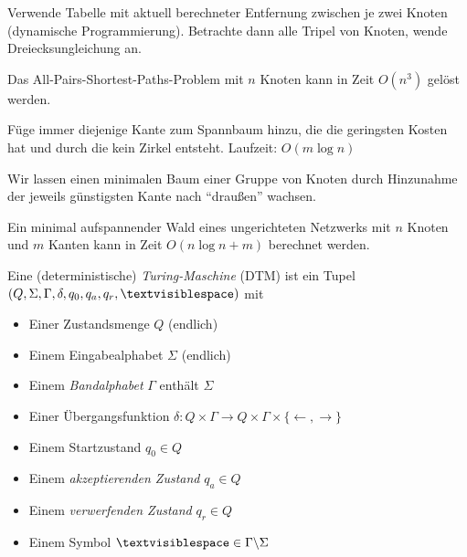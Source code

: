 \documentclass{cheat-sheet}
\begin{document}

\begin{alg}
  Verwende Tabelle mit aktuell berechneter Entfernung zwischen je zwei Knoten (dynamische Programmierung). Betrachte dann alle Tripel von Knoten, wende Dreiecksungleichung an.
\end{alg}

\begin{satz}
  Das All-Pairs-Shortest-Paths-Problem mit $n$ Knoten kann in Zeit $O(n^3)$ gelöst werden.
\end{satz}




\begin{alg}[Kruskal]
  Füge immer diejenige Kante zum Spannbaum hinzu, die die geringsten Kosten hat und durch die kein Zirkel entsteht. Laufzeit: $O(m \log n)$
\end{alg}


\begin{alg}[Prim]
  Wir lassen einen minimalen Baum einer Gruppe von Knoten durch Hinzunahme der jeweils günstigsten Kante nach "`draußen"' wachsen.
\end{alg}

\begin{satz}
  Ein minimal aufspannender Wald eines ungerichteten Netzwerks mit $n$ Knoten und $m$ Kanten kann in Zeit $O(n \log n + m)$ berechnet werden.
\end{satz}



\begin{defn}
  Eine (deterministische) \emph{Turing-Maschine} (DTM) ist ein Tupel $(Q, \Sigma, \Gamma, \delta, q_{0}, q_{a}, q_{r}, \textvisiblespace)$ mit

  \begin{itemize}{\leftmargin=0em}
    \setlength{\leftmargin}{0pt}
    \item Einer Zustandsmenge $Q$ (endlich)
    \item Einem Eingabealphabet $\Sigma$ (endlich)
    \item Einem \emph{Bandalphabet} $\Gamma$ enthält $\Sigma$
    \item Einer Übergangsfunktion $\delta : Q \times \Gamma \to Q \times \Gamma \times \{ \leftarrow, \rightarrow \} $
    \item Einem Startzustand $q_{0} \in Q$
    \item Einem \emph{akzeptierenden Zustand} $q_{a} \in Q$
    \item Einem \emph{verwerfenden Zustand} $q_{r} \in Q$
    \item Einem Symbol $\textvisiblespace \in \Gamma \backslash \Sigma$
  \end{itemize}
\end{defn}
\end{document}
